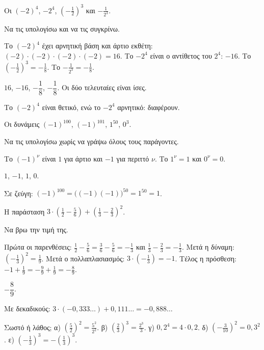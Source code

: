 \tixero Οι $(-2)^4$, $-2^4$, $\left(-\frac{1}{2}\right)^3$ και $-\frac{1}{2^3}$.\par
\tithelo Να τις υπολογίσω και να τις συγκρίνω.\par
\possindeo Το $(-2)^4$ έχει αρνητική βάση και άρτιο εκθέτη: $(-2)\cdot(-2)\cdot(-2)\cdot(-2)=16$. Το $-2^4$ είναι ο αντίθετος του $2^4$: $-16$. Το $\left(-\frac{1}{2}\right)^3=-\frac{1}{8}$. Το $-\frac{1}{2^3}=-\frac{1}{8}$.\par
\apantisi $16$, $-16$, $-\dfrac{1}{8}$, $-\dfrac{1}{8}$. Οι δύο τελευταίες είναι ίσες.\par
\elegxos Το $(-2)^4$ είναι θετικό, ενώ το $-2^4$ αρνητικό: διαφέρουν.

\tixero Οι δυνάμεις $(-1)^{100}$, $(-1)^{101}$, $1^{50}$, $0^3$.\par
\tithelo Να τις υπολογίσω χωρίς να γράψω όλους τους παράγοντες.\par
\possindeo Το $(-1)^{\nu}$ είναι $1$ για άρτιο και $-1$ για περιττό $\nu$. Το $1^{\nu}=1$ και $0^{\nu}=0$.\par
\apantisi $1$, $-1$, $1$, $0$.\par
\elegxos Σε ζεύγη: $(-1)^{100}=\big((-1)(-1)\big)^{50}=1^{50}=1$.

\tixero Η παράσταση $3\cdot\left(\frac{1}{2}-\frac{5}{6}\right)+\left(\frac{1}{3}-\frac{2}{3}\right)^2$.\par
\tithelo Να βρω την τιμή της.\par
\possindeo Πρώτα οι παρενθέσεις: $\frac{1}{2}-\frac{5}{6}=\frac{3}{6}-\frac{5}{6}=-\frac{1}{3}$ και $\frac{1}{3}-\frac{2}{3}=-\frac{1}{3}$. Μετά η δύναμη: $\left(-\frac{1}{3}\right)^2=\frac{1}{9}$. Μετά ο πολλαπλασιασμός: $3\cdot\left(-\frac{1}{3}\right)=-1$. Τέλος η πρόσθεση: $-1+\frac{1}{9}=-\frac{9}{9}+\frac{1}{9}=-\frac{8}{9}$.\par
\apantisi $-\dfrac{8}{9}$.\par
\elegxos Με δεκαδικούς: $3\cdot(-0{,}333\ldots)+0{,}111\ldots=-0{,}888\ldots$



\ex Σωστό ή λάθος; α) $\left(\frac{5}{2}\right)^2=\frac{5^2}{2^2}$. \quad β) $\left(\frac{2}{3}\right)^3=\frac{2^3}{3}$. \quad γ) $0{,}2^4=4\cdot0{,}2$. \quad δ) $\left(-\frac{3}{10}\right)^2=0{,}3^2$. \quad ε) $\left(-\frac{1}{3}\right)^3=-\left(\frac{1}{3}\right)^3$.

